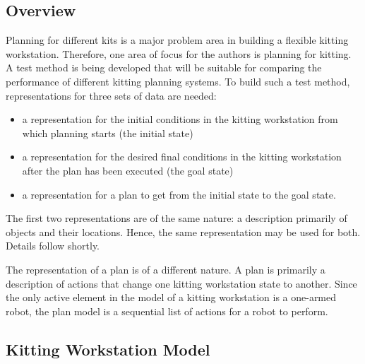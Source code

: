 \subsection{Overview}

Planning for different kits is a major problem area in building a
flexible kitting workstation. Therefore, one area of focus for the
authors is planning for
kitting.  A test method is being developed that will be suitable for
comparing the performance of different kitting planning systems.  To build
such a test method, representations for three sets of data are needed:
\begin{itemize}
\item a representation for the initial conditions in the kitting workstation
 from which planning starts (the initial state)

\item a representation for the desired final conditions in the kitting
workstation after the plan has been executed (the goal state)

\item a representation for a plan to get from the initial state to the goal
state.
\end{itemize}

The first two representations are of the same nature: a description
primarily of objects and their locations. Hence, the same representation
may be used for both. Details follow shortly.

The representation of a plan is of a different nature. A plan is primarily
a description of actions that change one kitting workstation state to
another. Since the only active element in the model of a kitting
workstation is a one-armed robot, the plan model is a sequential
list of actions for a robot to perform.

\subsection{Kitting Workstation Model}

